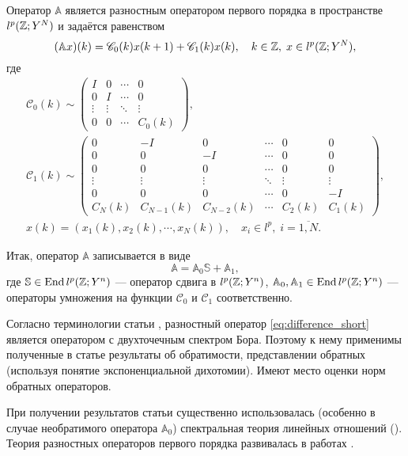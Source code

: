 Оператор $\mathbb A$ является разностным оператором первого порядка в пространстве $l^p(\mathbb{Z}; Y^N)$ и задаётся равенством
\begin{equation}\label{eq:difference_first_order}
(\mathbb A x)(k) = \mathcal C_0(k) x(k + 1) + \mathcal C_1(k) x(k) , \quad k \in \mathbb{Z}, \; x \in l^p(\mathbb{Z}; Y^N),
\end{equation}
где
\begin{gather*}
   \mathcal C_0(k) \sim \begin{pmatrix}
    I & 0 & \cdots &  0 \\
    0 & I  & \cdots &  0 \\
    \vdots & \vdots & \ddots &  \vdots \\
    0 & 0 & \cdots &  C_0(k)
   \end{pmatrix},\\
   \mathcal C_1(k) \sim \begin{pmatrix}
    0 & -I & 0  & \cdots & 0 & 0 \\
    0 & 0  & -I & \cdots & 0 & 0 \\
    0 & 0  & 0 & \cdots & 0 & 0 \\
    \vdots & \vdots & \vdots & \ddots & \vdots & \vdots \\
    0 & 0 & 0 & \cdots & 0 & -I \\
    C_N(k) & C_{N-1}(k) & C_{N-2}(k) & \cdots & C_2(k) & C_1(k)
   \end{pmatrix},\\[0.5em]
   x(k) = (x_1(k), x_2(k), \cdots, x_N(k)), \quad x_i \in l^p, \; i = \overline{1,N}.
\end{gather*}

Итак, оператор $\mathbb A$ записывается в виде
\begin{equation}\label{eq:difference_short}
    \mathbb A = \mathbb A_0 \mathbb S + \mathbb A_1,
\end{equation}
где $\mathbb S \in \operatorname{End} l^p(\mathbb{Z}; Y^n)$ --- оператор сдвига в $l^p(\mathbb{Z}; Y^n)$, $\mathbb A_0, \mathbb A_1 \in \operatorname{End} l^p(\mathbb{Z}; Y^n)$ --- операторы умножения на функции $\mathcal C_0$ и $\mathcal C_1$ соответственно.

Согласно терминологии статьи \cite{bohr2005}, разностный оператор \ref{eq:difference_short} является оператором с двухточечным спектром Бора. Поэтому к нему применимы полученные в статье результаты об обратимости, представлении обратных (используя понятие экспоненциальной дихотомии). Имеют место оценки норм обратных операторов.

При получении результатов статьи \cite{bohr2005} существенно использовалась (особенно в случае необратимого оператора $\mathbb A_0$) спектральная теория линейных отношений (\cite{relations2002, relations2008}). Теория разностных операторов первого порядка развивалась в работах \cite{antonevich2,antonevich,kurbatov,kurbatov2,massera,henri,megan,dorogovtsev,chicone,inverse1992,memory2014,green2015,BasDup15,BasPas01,Bas00,Bas13,Bas15,Bic10,Bic13,Bic14}.

